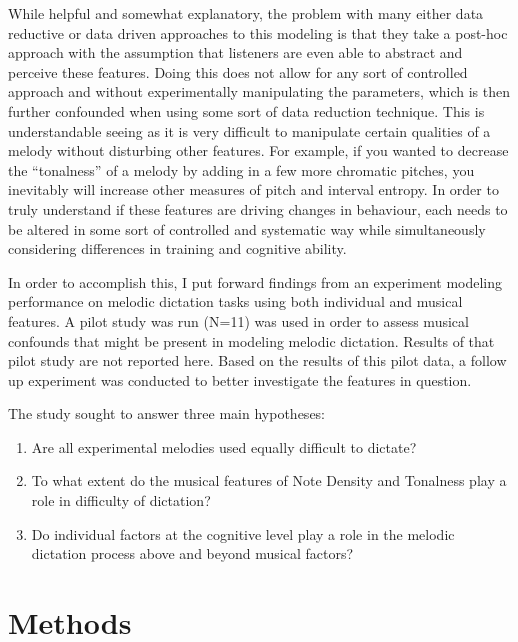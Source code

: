 \documentclass[]{book}
\providecommand{\tightlist}{%
  \setlength{\itemsep}{0pt}\setlength{\parskip}{0pt}}
\begin{document}
While helpful and somewhat explanatory, the problem with many either data reductive or data driven approaches to this modeling is that they take a post-hoc approach with the assumption that listeners are even able to abstract and perceive these features.
Doing this does not allow for any sort of controlled approach and without experimentally manipulating the parameters, which is then further confounded when using some sort of data reduction technique.
This is understandable seeing as it is very difficult to manipulate certain qualities of a melody without disturbing
other features\citep{taylorStrategiesMemoryShort1983}.
For example, if you wanted to decrease the ``tonalness'' of a melody by adding in a few more chromatic pitches, you inevitably will increase other measures of pitch and interval entropy.
In order to truly understand if these features are driving changes in behaviour, each needs to be altered in some sort of controlled and systematic way while simultaneously considering differences in training and cognitive ability.

In order to accomplish this, I put forward findings from an experiment modeling performance on melodic dictation tasks using both individual and musical features.
A pilot study was run (N=11) was used in order to assess musical confounds that might be present in modeling melodic dictation.
Results of that pilot study are not reported here.
Based on the results of this pilot data, a follow up experiment was conducted to better investigate the features in question.

The study sought to answer three main hypotheses:

\begin{enumerate}
\def\labelenumi{\arabic{enumi}.}
\tightlist
\item
  Are all experimental melodies used equally difficult to
  dictate?
\item
  To what extent do the musical features of Note Density
  and Tonalness play a role in difficulty of dictation?
\item
  Do individual factors at the cognitive level play a role
  in the melodic dictation process above and beyond musical
  factors?
\end{enumerate}

\hypertarget{methods-1}{%
\section{Methods}\label{methods-1}}
\end{document}
